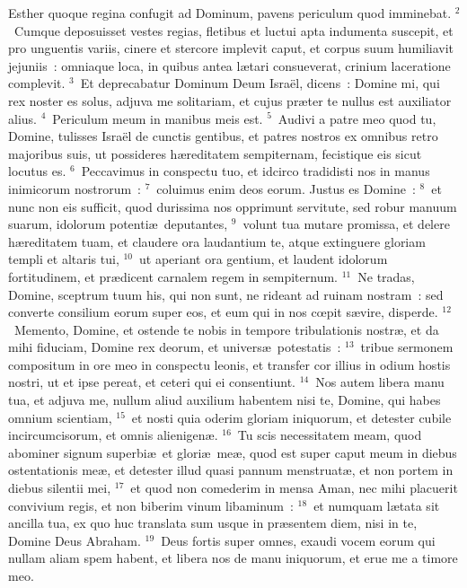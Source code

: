 \lettrine[lines=10,image=true,loversize=0.05,lraise=-0.03]{E}{}sther quoque regina confugit ad Dominum, pavens periculum quod imminebat.
${}^{2}$~Cumque deposuisset vestes regias, fletibus et luctui apta indumenta suscepit, et pro unguentis variis, cinere et stercore implevit caput, et corpus suum humiliavit jejuniis~: omniaque loca, in quibus antea l\ae tari consueverat, crinium laceratione complevit.
${}^{3}$~Et deprecabatur Dominum Deum Isra\"el, dicens~: Domine mi, qui rex noster es solus, adjuva me solitariam, et cujus pr\ae ter te nullus est auxiliator alius.
${}^{4}$~Periculum meum in manibus meis est.
${}^{5}$~Audivi a patre meo quod tu, Domine, tulisses Isra\"el de cunctis gentibus, et patres nostros ex omnibus retro majoribus suis, ut possideres h\ae reditatem sempiternam, fecistique eis sicut locutus es.
${}^{6}$~Peccavimus in conspectu tuo, et idcirco tradidisti nos in manus inimicorum nostrorum~:
${}^{7}$~coluimus enim deos eorum. Justus es Domine~:
${}^{8}$~et nunc non eis sufficit, quod durissima nos opprimunt servitute, sed robur manuum suarum, idolorum potenti\ae\ deputantes,
${}^{9}$~volunt tua mutare promissa, et delere h\ae reditatem tuam, et claudere ora laudantium te, atque extinguere gloriam templi et altaris tui,
${}^{10}$~ut aperiant ora gentium, et laudent idolorum fortitudinem, et pr\ae dicent carnalem regem in sempiternum.
${}^{11}$~Ne tradas, Domine, sceptrum tuum his, qui non sunt, ne rideant ad ruinam nostram~: sed converte consilium eorum super eos, et eum qui in nos cœpit s\ae vire, disperde.
${}^{12}$~Memento, Domine, et ostende te nobis in tempore tribulationis nostr\ae , et da mihi fiduciam, Domine rex deorum, et univers\ae\ potestatis~:
${}^{13}$~tribue sermonem compositum in ore meo in conspectu leonis, et transfer cor illius in odium hostis nostri, ut et ipse pereat, et ceteri qui ei consentiunt.
${}^{14}$~Nos autem libera manu tua, et adjuva me, nullum aliud auxilium habentem nisi te, Domine, qui habes omnium scientiam,
${}^{15}$~et nosti quia oderim gloriam iniquorum, et detester cubile incircumcisorum, et omnis alienigen\ae .
${}^{16}$~Tu scis necessitatem meam, quod abominer signum superbi\ae\ et glori\ae\ me\ae , quod est super caput meum in diebus ostentationis me\ae , et detester illud quasi pannum menstruat\ae , et non portem in diebus silentii mei,
${}^{17}$~et quod non comederim in mensa Aman, nec mihi placuerit convivium regis, et non biberim vinum libaminum~:
${}^{18}$~et numquam l\ae tata sit ancilla tua, ex quo huc translata sum usque in pr\ae sentem diem, nisi in te, Domine Deus Abraham.
${}^{19}$~Deus fortis super omnes, exaudi vocem eorum qui nullam aliam spem habent, et libera nos de manu iniquorum, et erue me a timore meo.

